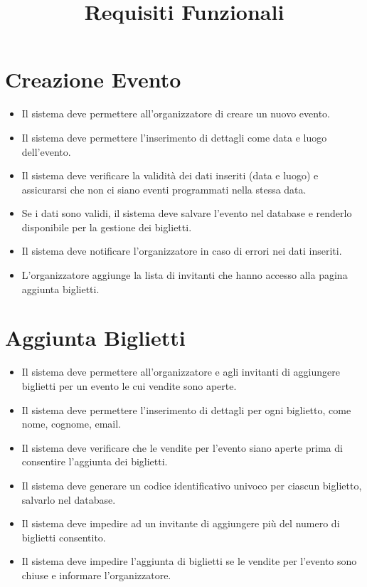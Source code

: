 \documentclass[a4paper,12pt]{article}
\title{\textcolor{titlecolor}{\Huge Requisiti Funzionali \vspace{0.2cm}}}
\author{}
\date{}
\begin{document}
\maketitle

\section*{\textcolor{sectioncolor}{Creazione Evento}}
\textcolor{textcolor}{
\begin{itemize}
    \item Il sistema deve permettere all’organizzatore di creare un nuovo evento.
    \item Il sistema deve permettere l'inserimento di dettagli come data e luogo dell'evento.
    \item Il sistema deve verificare la validità dei dati inseriti (data e luogo) e assicurarsi che non ci siano eventi programmati nella stessa data.
    \item Se i dati sono validi, il sistema deve salvare l'evento nel database e renderlo disponibile per la gestione dei biglietti.
    \item Il sistema deve notificare l’organizzatore in caso di errori nei dati inseriti.
    \item L’organizzatore aggiunge la lista di invitanti che hanno accesso alla pagina aggiunta biglietti.
\end{itemize}
}

\section*{\textcolor{sectioncolor}{Aggiunta Biglietti}}
\textcolor{textcolor}{
\begin{itemize}
    \item Il sistema deve permettere all’organizzatore e agli invitanti di aggiungere biglietti per un evento le cui vendite sono aperte.
    \item Il sistema deve permettere l'inserimento di dettagli per ogni biglietto, come nome, cognome, email.
    \item Il sistema deve verificare che le vendite per l'evento siano aperte prima di consentire l'aggiunta dei biglietti.
    \item Il sistema deve generare un codice identificativo univoco per ciascun biglietto, salvarlo nel database.
    \item Il sistema deve impedire ad un invitante di aggiungere più del numero di biglietti consentito.
    \item Il sistema deve impedire l'aggiunta di biglietti se le vendite per l'evento sono chiuse e informare l’organizzatore.
\end{itemize}
}
\end{document}
